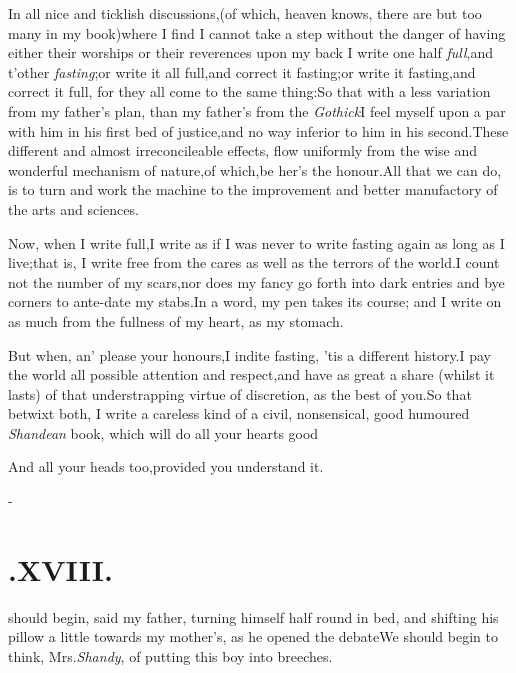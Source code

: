 \documentclass{article}
\begin{document}
In all nice and ticklish discussions,\tsk (of which, heaven
knows, there are but too many in my book)\tsk where I find I
cannot take a step without the danger of having either their
worships or their reverences upon my back\tsh\break
I write one half \textit{full},\tsk and t’other
\textit{fasting};\tsh or write it all full,\tsk and
correct it fasting;\tsh or write it fasting,\tsk and
correct it full, for they all come to the same
thing:\tsh So that with a less variation from my
father’s plan, than my father’s from the
\textit{Gothick}\tsk I feel myself upon a par with him in his first
bed of justice,\tsk and no way inferior to him in his
second.\tsh These different and almost irreconcileable
effects, flow uniformly from the wise and wonderful mechanism of
nature,\tsk of which,\tsk be her’s the
honour.\tsh All that we can do, is to turn and work the
machine to the improvement and better manufactory of the arts and
sciences.\tsh

Now, when I write full,\tsk I write as if I was never to write
fasting again as long as I live;\tsh that is, I write free
from the cares as well as the terrors of the
world.\tsh I count not the number of my scars,\tsk nor
does my fancy go forth into dark entries and bye corners to
ante-date my stabs.\tsh In a word, my pen takes its
course; and I write on as much from the fullness of my heart, as my\break
stomach.\tsh

But when, an’ please your honours,\break I indite fasting, ’tis
a different history.\break\tsh I pay the world all possible
attention and respect,\tsk and have as great a share (whilst it
lasts) of that understrap\-ping virtue of discretion, as the best
of you.\tsh So that betwixt both, I write a careless kind of a
civil, nonsensical, good humoured \textit{Shandean} book, which
will do all your hearts good\tsh

\tsh And all your heads too,\tsk provided you
understand it.

\vfill{}\eject
\null\kern-\baselineskip
\section{.\enspace XVIII.}

 should begin, said my father,
turning himself half round in bed, and shifting his pillow a little
towards my mother’s, as he opened the debate\tsh We
should begin to think, Mrs.\@ \textit{Shandy}, of putting this boy into
breeches.\tsh
\end{document}
